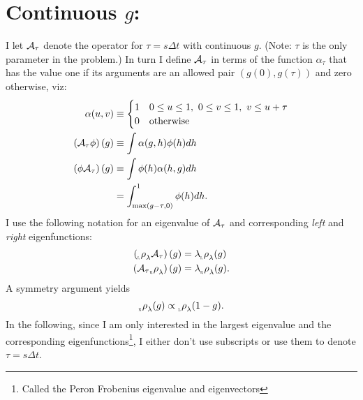 \documentclass[12pt]{article} \usepackage{amsmath,amsfonts}
\newcommand{\Aop}{{\cal A}}
\newcommand{\Aindicate}{\alpha}
\newcommand{\slope}{s}
\newcommand{\function}{\phi}
\newcommand{\rightfunction}{{_{_{\scalebox{.4}{R}}} \rho}}
\newcommand{\leftfunction}{{_{_{\scalebox{.4}{L}}} \rho}}
\begin{document}
\section{Continuous $g$:}
\label{sec:continuous_g}

I let $\Aop_\tau$ denote the operator for $\tau = \slope \Delta t$
with continuous $g$.  (Note: $\tau$ is the only parameter in the
problem.)  In turn I define $\Aop_\tau$ in terms of the function
$\Aindicate_\tau$ that has the value one if its arguments are an
allowed pair $\left( g(0), g(\tau) \right)$ and zero otherwise, viz:
\begin{subequations}
  \begin{align}
    \label{eq:indicate}
    \Aindicate(u,v) &\equiv
    \begin{cases}
      1 & 0 \leq u \leq 1,~ 0 \leq v \leq 1,~ v \leq u + \tau\\
      0 & \text{otherwise}
    \end{cases}\\
    \label{eq:operateright}
    \left( \Aop_\tau  \function \right)(g) &\equiv \int
            \Aindicate(g,h) \function(h) dh \\
    \label{eq:operateleft}
    \left( \function \Aop_\tau \right)(g) &\equiv \int
           \function(h) \Aindicate(h,g) dh \\
    &= \int_{\max(g-\tau,0)}^1 \function(h) dh.
  \end{align}
\end{subequations}
I use the following notation for an eigenvalue of $\Aop_\tau$ and
corresponding \emph{left} and \emph{right} eigenfunctions:
\begin{align*}
 \left( \leftfunction_\lambda \Aop_\tau \right)(g) &= \lambda
 \leftfunction_\lambda (g)\\
 \left(\Aop_\tau  \rightfunction_\lambda \right)(g) &= \lambda
 \rightfunction_\lambda (g).
\end{align*}
A symmetry argument yields
\begin{equation}
  \label{eq:symmetry}
  \rightfunction_\lambda(g) \propto \leftfunction_\lambda(1-g).
\end{equation}
In the following, since I am only interested in the largest
eigenvalue and the corresponding eigenfunctions\footnote{Called
  the Peron Frobenius eigenvalue and eigenvectors}, I either don't use
subscripts or use them to denote $\tau=s\Delta t$.
\end{document}
